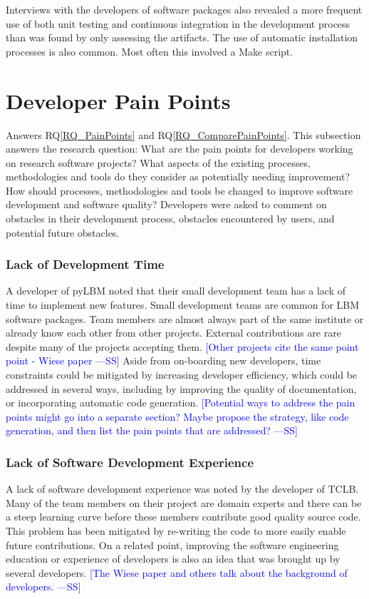 \documentclass[final, 3p, times, authoryear]{elsarticle}
\newcommand{\authornote}[3]{\textcolor{#1}{[#3 ---#2]}}
\newcommand{\authornote}[3]{}
\newcommand{\wss}[1]{\authornote{blue}{SS}{#1}} %
\newcommand{\rqref}[1]{RQ\ref{#1}}
\begin{document}
Interviews with the developers of software packages also revealed a more
frequent use of both unit testing and continuous integration in the development
process than was found by only assessing the artifacts. The use of automatic
installation processes is also common. Most often this involved a Make script.

\section{Developer Pain Points} \label{painpoints}

Answers \rqref{RQ_PainPoints} and \rqref{RQ_ComparePainPoints}.  This subsection
answers the research question: What are the pain points for developers working
on research software projects? What aspects of the existing processes,
methodologies and tools do they consider as potentially needing improvement? How
should processes, methodologies and tools be changed to improve software
development and software quality? Developers were asked to comment on obstacles
in their development process, obstacles encountered by users, and potential
future obstacles.

\subsubsection{Lack of Development Time}

A developer of pyLBM noted that their small development team has a lack of time
to implement new features. Small development teams are common for LBM software
packages. Team members are almost always part of the same institute or already
know each other from other projects. External contributions are rare despite
many of the projects accepting them. \wss{Other projects cite the same point
point - Wiese paper}  Aside from on-boarding new developers, time constraints
could be mitigated by increasing developer efficiency, which could be addressed
in several ways, including by improving the quality of documentation, or
incorporating automatic code generation. \wss{Potential ways to address the pain
points might go into a separate section?  Maybe propose the strategy, like code
generation, and then list the pain points that are addressed?}

\subsubsection{Lack of Software Development Experience}

A lack of software development experience was noted by the developer of TCLB.
Many of the team members on their project are domain experts and there can be a
steep learning curve before these members contribute good quality source code.
This problem has been mitigated by re-writing the code to more easily enable
future contributions.  On a related point, improving the software engineering
education or experience of developers is also an idea that was brought up by
several developers.  \wss{The Wiese paper and others talk about the background
of developers.}
\end{document}
